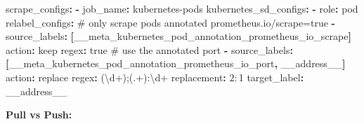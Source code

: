 \documentclass[11pt]{article}
\newenvironment{Shaded}{\begin{snugshade}}{\end{snugshade}}
\newcommand{\AttributeTok}[1]{\textcolor[rgb]{0.16,0.50,0.73}{#1}}
\newcommand{\CharTok}[1]{\textcolor[rgb]{0.24,0.68,0.91}{#1}}
\newcommand{\CommentTok}[1]{\textcolor[rgb]{0.48,0.49,0.49}{#1}}
\newcommand{\FunctionTok}[1]{\textcolor[rgb]{0.56,0.27,0.68}{#1}}
\newcommand{\KeywordTok}[1]{\textcolor[rgb]{0.81,0.81,0.76}{\textbf{#1}}}
\newcommand{\StringTok}[1]{\textcolor[rgb]{0.96,0.31,0.31}{#1}}
\begin{document}

\begin{Shaded}
\begin{Highlighting}[]
\FunctionTok{scrape\_configs}\KeywordTok{:}
\AttributeTok{  }\KeywordTok{{-}}\AttributeTok{ }\FunctionTok{job\_name}\KeywordTok{:}\AttributeTok{ }\StringTok{\textquotesingle{}kubernetes{-}pods\textquotesingle{}}
\AttributeTok{    }\FunctionTok{kubernetes\_sd\_configs}\KeywordTok{:}
\AttributeTok{      }\KeywordTok{{-}}\AttributeTok{ }\FunctionTok{role}\KeywordTok{:}\AttributeTok{ pod}
\AttributeTok{    }\FunctionTok{relabel\_configs}\KeywordTok{:}
\CommentTok{      \# only scrape pods annotated prometheus.io/scrape=true}
\AttributeTok{      }\KeywordTok{{-}}\AttributeTok{ }\FunctionTok{source\_labels}\KeywordTok{:}\AttributeTok{ }\KeywordTok{[}\AttributeTok{\_\_meta\_kubernetes\_pod\_annotation\_prometheus\_io\_scrape}\KeywordTok{]}
\AttributeTok{        }\FunctionTok{action}\KeywordTok{:}\AttributeTok{ keep}
\AttributeTok{        }\FunctionTok{regex}\KeywordTok{:}\AttributeTok{ }\CharTok{true}
\CommentTok{      \# use the annotated port}
\AttributeTok{      }\KeywordTok{{-}}\AttributeTok{ }\FunctionTok{source\_labels}\KeywordTok{:}\AttributeTok{ }\KeywordTok{[}\AttributeTok{\_\_meta\_kubernetes\_pod\_annotation\_prometheus\_io\_port}\KeywordTok{,}
\AttributeTok{                        \_\_address\_\_}\KeywordTok{]}
\AttributeTok{        }\FunctionTok{action}\KeywordTok{:}\AttributeTok{ replace}
\AttributeTok{        }\FunctionTok{regex}\KeywordTok{:}\AttributeTok{ (\textbackslash{}d+);(.+):\textbackslash{}d+}
\AttributeTok{        }\FunctionTok{replacement}\KeywordTok{:}\AttributeTok{ $2:$1}
\AttributeTok{        }\FunctionTok{target\_label}\KeywordTok{:}\AttributeTok{ \_\_address\_\_}
\end{Highlighting}
\end{Shaded}

\textbf{Pull vs Push:}
\end{document}
